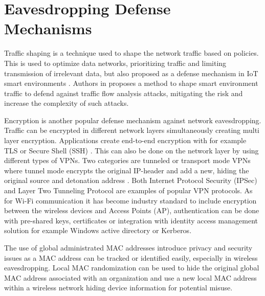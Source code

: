 \section{Eavesdropping Defense Mechanisms}
Traffic shaping is a technique used to shape the network traffic based on policies. This is used to optimize data networks, prioritizing traffic and limiting transmission of irrelevant data, but also proposed as a defense mechanism in \gls{IoT} smart environments \cite{traffic_shaping_saeed2017carousel}. Authors in \cite{traffic_shaping_xiong2022network} proposes a method to shape smart environment traffic to defend against traffic flow analysis attacks, mitigating the risk and increase the complexity of such attacks. 

Encryption is another popular defense mechanism against network eavesdropping. Traffic can be encrypted in different network layers simultaneously creating multi layer encryption. Applications create end-to-end encryption with for example \gls{TLS} \cite{tls_rfc} or Secure Shell (SSH) \cite{ssh_rfc}. This can also be done on the network layer by using different types of \gls{VPN}s. Two categories are tunneled or transport mode \gls{VPN}s where tunnel mode encrypts the original \gls{IP}-header and add a new, hiding the original source and detonation address \cite{ipsec_rfc} \cite{l2tp_rfc}. Both Internet Protocol Security (IPSec) \cite{ipsec_rfc} and Layer Two Tunneling Protocol \cite{l2tp_rfc} are examples of popular \gls{VPN} protocols. As for \gls{Wi-Fi} communication it has become industry standard to include encryption between the wireless devices and Access Points (AP), authentication can be done with pre-shared keys, certificates or integration with identity access management solution for example Windows active directory or Kerberos. 

The use of global administrated \gls{MAC} addresses introduce privacy and security issues as a \gls{MAC} address can be tracked or identified easily, especially in wireless eavesdropping. Local \gls{MAC} randomization \cite{ietf-madinas-mac-address-randomization-06} can be used to hide the original global \gls{MAC} address associated with an organization and use a new local \gls{MAC} address within a wireless network hiding device information for potential misuse.



